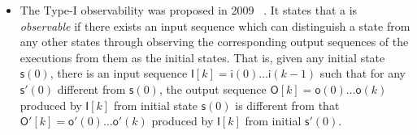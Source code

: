 \begin{itemize}
\item The  {\sf Type-I}  observability was proposed in 2009 ~\cite{cheng2009controllability}. It states that a {\BCN} is {\em observable} if there exists an input sequence  which can distinguish a state  from any other  states through observing the corresponding output sequences of the executions from them  as the initial states. That is,  given any initial state $\mathsf{s}(0)$, there is an input sequence $\mathsf{I}[k]=\mathsf{i}(0)\ldots\mathsf{i}(k-1)$  such that  for any  $\mathsf{s}'(0)$ different from $\mathsf{s}(0)$, the output sequence  $\mathsf{O}[k]=\mathsf{o}(0)\ldots\mathsf{o}(k)$ produced by  $\mathsf{I}[k]$ from initial state $\mathsf{s}(0)$ is different from that   $\mathsf{O}'[k]=\mathsf{o}'(0)\ldots \mathsf{o}'(k)$ produced by $\mathsf{I}[k]$ from initial $\mathsf{s}'(0)$.

	

\end{itemize}
